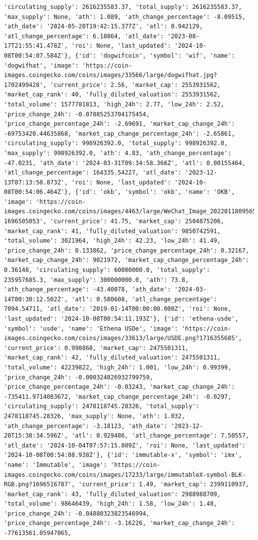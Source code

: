 \documentclass[
  letterpaper,
  DIV=11,
  numbers=noendperiod]{scrreprt}
\begin{document}
\begin{verbatim}
'circulating_supply': 2616235583.37, 'total_supply': 2616235583.37, 'max_supply': None, 'ath': 1.089, 'ath_change_percentage': -8.09515, 'ath_date': '2024-05-20T19:42:15.377Z', 'atl': 0.942129, 'atl_change_percentage': 6.18864, 'atl_date': '2023-08-17T21:55:41.478Z', 'roi': None, 'last_updated': '2024-10-08T00:54:07.584Z'}, {'id': 'dogwifcoin', 'symbol': 'wif', 'name': 'dogwifhat', 'image': 'https://coin-images.coingecko.com/coins/images/33566/large/dogwifhat.jpg?1702499428', 'current_price': 2.56, 'market_cap': 2553931562, 'market_cap_rank': 40, 'fully_diluted_valuation': 2553931562, 'total_volume': 1577781813, 'high_24h': 2.77, 'low_24h': 2.52, 'price_change_24h': -0.07085253704175454, 'price_change_percentage_24h': -2.69691, 'market_cap_change_24h': -69753420.44635868, 'market_cap_change_percentage_24h': -2.65861, 'circulating_supply': 998926392.0, 'total_supply': 998926392.0, 'max_supply': 998926392.0, 'ath': 4.83, 'ath_change_percentage': -47.0231, 'ath_date': '2024-03-31T09:34:58.366Z', 'atl': 0.00155464, 'atl_change_percentage': 164335.54227, 'atl_date': '2023-12-13T07:13:50.873Z', 'roi': None, 'last_updated': '2024-10-08T00:54:06.464Z'}, {'id': 'okb', 'symbol': 'okb', 'name': 'OKB', 'image': 'https://coin-images.coingecko.com/coins/images/4463/large/WeChat_Image_20220118095654.png?1696505053', 'current_price': 41.75, 'market_cap': 2504875206, 'market_cap_rank': 41, 'fully_diluted_valuation': 9850742591, 'total_volume': 3021964, 'high_24h': 42.23, 'low_24h': 41.49, 'price_change_24h': 0.133862, 'price_change_percentage_24h': 0.32167, 'market_cap_change_24h': 9021972, 'market_cap_change_percentage_24h': 0.36148, 'circulating_supply': 60000000.0, 'total_supply': 235957685.3, 'max_supply': 300000000.0, 'ath': 73.8, 'ath_change_percentage': -43.40078, 'ath_date': '2024-03-14T00:30:12.502Z', 'atl': 0.580608, 'atl_change_percentage': 7094.54711, 'atl_date': '2019-01-14T00:00:00.000Z', 'roi': None, 'last_updated': '2024-10-08T00:54:11.193Z'}, {'id': 'ethena-usde', 'symbol': 'usde', 'name': 'Ethena USDe', 'image': 'https://coin-images.coingecko.com/coins/images/33613/large/USDE.png?1716355685', 'current_price': 0.998868, 'market_cap': 2475501311, 'market_cap_rank': 42, 'fully_diluted_valuation': 2475501311, 'total_volume': 42239822, 'high_24h': 1.001, 'low_24h': 0.99399, 'price_change_24h': -0.000324026932799759, 'price_change_percentage_24h': -0.03243, 'market_cap_change_24h': -735411.9714083672, 'market_cap_change_percentage_24h': -0.0297, 'circulating_supply': 2478118745.28326, 'total_supply': 2478118745.28326, 'max_supply': None, 'ath': 1.032, 'ath_change_percentage': -3.18123, 'ath_date': '2023-12-20T15:38:34.596Z', 'atl': 0.929486, 'atl_change_percentage': 7.50557, 'atl_date': '2024-10-04T07:57:15.809Z', 'roi': None, 'last_updated': '2024-10-08T00:54:08.938Z'}, {'id': 'immutable-x', 'symbol': 'imx', 'name': 'Immutable', 'image': 'https://coin-images.coingecko.com/coins/images/17233/large/immutableX-symbol-BLK-RGB.png?1696516787', 'current_price': 1.49, 'market_cap': 2399110937, 'market_cap_rank': 43, 'fully_diluted_valuation': 2988988709, 'total_volume': 98646439, 'high_24h': 1.58, 'low_24h': 1.48, 'price_change_24h': -0.04880323823546994, 'price_change_percentage_24h': -3.16226, 'market_cap_change_24h': -77613561.05947065, 
\end{verbatim}
\end{document}
